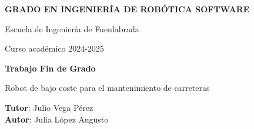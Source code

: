 \thispagestyle{empty}
\vspace{2cm}

\begin{figure}[htb]
  \centerline{}
\end{figure}

\begin{center}
  {\Large {\bf GRADO EN INGENIERÍA DE ROBÓTICA SOFTWARE}}
  \vspace{5mm}
 
  {\large {Escuela de Ingeniería de Fuenlabrada}}
  \vspace{5mm}

  {\large {Curso académico 2024-2025}}

  \vspace{1cm}

  {\large {\bf Trabajo Fin de Grado}}

  \vspace{2cm}

  {\Large {Robot de bajo coste para el mantenimiento de carreteras\\}}

  \vspace{5cm}
  {\bf Tutor}: Julio Vega Pérez \\
  {\bf Autor}: Julia López Augusto
\end{center}

\clearpage
\thispagestyle{empty}

